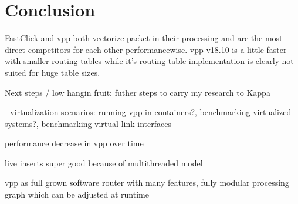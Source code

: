 \chapter{Conclusion}

FastClick and \Ac{vpp} both vectorize packet in their processing and
are the most direct competitors for each other performancewise.
\Ac{vpp} v18.10 is a little faster with smaller routing tables while
it's routing table implementation is clearly not suited for huge
table sizes. %

Next steps / low hangin fruit: futher steps to carry my research to Kappa

- virtualization scenarios: running vpp in containers?, benchmarking virtualized systems?, benchmarking virtual link interfaces


performance decrease in vpp over time

live inserts super good because of multithreaded model

vpp as full grown software router with many features, fully modular processing graph which can be adjusted at runtime